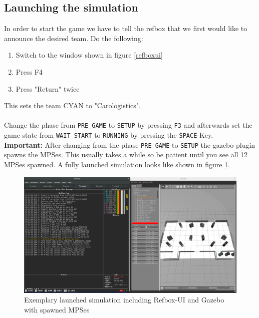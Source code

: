 \documentclass[oribibl]{llncs}
\begin{document}
\subsection{Launching the simulation}
In order to start the game we have to tell the refbox that we first would like to announce the desired team. Do the following:
\begin{enumerate}
        \item Switch to the window shown in figure \ref{refboxui}
        \item Press F4
        \item Press "Return" twice
\end{enumerate}
This sets the team CYAN to "Carologistics".\\
\\
Change the phase from \texttt{PRE\_GAME} to \texttt{SETUP} by pressing \texttt{F3} and afterwards set the game state from \texttt{WAIT\_START} to \texttt{RUNNING} by pressing the \texttt{SPACE}-Key.\\
\textbf{Important:} After changing from the phase \texttt{PRE\_GAME} to \texttt{SETUP} the gazebo-plugin spawns the MPSes. This usually takes a while so be patient until you see all 12 MPSes spawned. A fully launched simulation looks like shown in figure \ref{simulaunchfull}.
\begin{figure}
        \centering
        \includegraphics[width=\textwidth]{images/simulaunchfull.png}
        \caption{Exemplary launched simulation including Refbox-UI and Gazebo with spawned MPSes}
        \label{simulaunchfull}
\end{figure}
\end{document}
